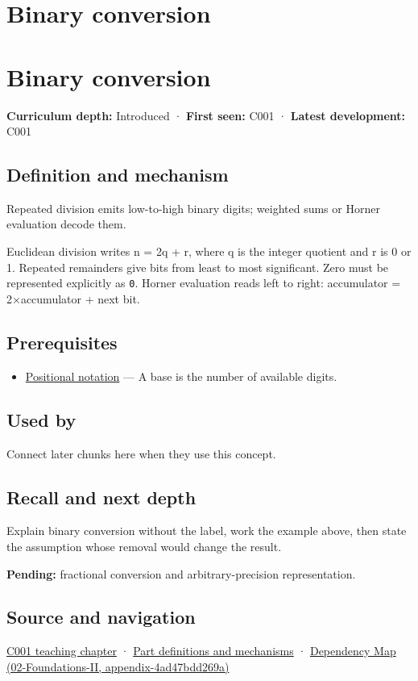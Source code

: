 \hypertarget{appendix-dc552784a2c0}{}
\section*{Binary conversion}
\section{Binary conversion}\label{binary-conversion}

\textbf{Curriculum depth:} Introduced · \textbf{First seen:} C001 · \textbf{Latest development:} C001

\subsection{Definition and mechanism}\label{definition-and-mechanism}

Repeated division emits low-to-high binary digits; weighted sums or Horner evaluation decode them.

Euclidean division writes n = 2q + r, where q is the integer quotient and r is 0 or 1. Repeated remainders give bits from least to most significant. Zero must be represented explicitly as \texttt{0}. Horner evaluation reads left to right: accumulator = 2×accumulator + next bit.

\subsection{Prerequisites}\label{prerequisites}

\begin{itemize}
\tightlist
\item
  \hyperref[appendix-83c3f28f7bda]{Positional notation} --- A base is the number of available digits.
\end{itemize}

\subsection{Used by}\label{used-by}

Connect later chunks here when they use this concept.

\subsection{Recall and next depth}\label{recall-and-next-depth}

Explain binary conversion without the label, work the example above, then state the assumption whose removal would change the result.

\textbf{Pending:} fractional conversion and arbitrary-precision representation.

\subsection{Source and navigation}\label{source-and-navigation}

\href{Continuous\%20Notes/Computing\%20Foundations\%20-\%20From\%20Bits\%20to\%20C++\%20and\%20Systems\%20APIs\#From\%20a\%20signal\%20to\%20an\%20interpretation}{C001 teaching chapter} · \hyperref[appendix-fd090d982a15]{Part definitions and mechanisms} · \href{}{Dependency Map (02-Foundations-II, appendix-4ad47bdd269a)}
